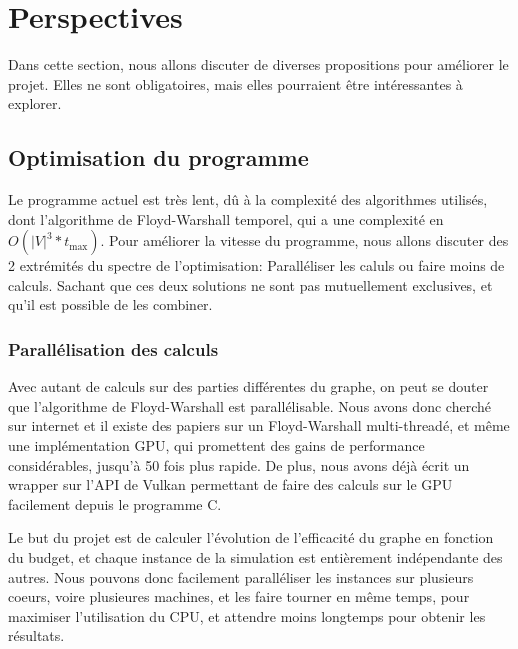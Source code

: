 \section{Perspectives}\label{sec:perspectives}
Dans cette section, nous allons discuter de diverses propositions pour améliorer le projet.
Elles ne sont obligatoires, mais elles pourraient être intéressantes à explorer.

\subsection{Optimisation du programme}\label{subsec:optimisation_du_programme}

Le programme actuel est très lent, dû à la complexité des algorithmes utilisés, dont l'algorithme de Floyd-Warshall temporel, qui a une complexité en $O(|V|^3*t_{\max})$.
Pour améliorer la vitesse du programme, nous allons discuter des 2 extrémités du spectre de l'optimisation: Paralléliser les caluls ou faire moins de calculs.
Sachant que ces deux solutions ne sont pas mutuellement exclusives, et qu'il est possible de les combiner.

\subsubsection{Parallélisation des calculs}\label{subsubsec:parallelisation}

\label{subsubsubsec:parallelisation_algorithme}
Avec autant de calculs sur des parties différentes du graphe, on peut se douter que l'algorithme de Floyd-Warshall est parallélisable.
Nous avons donc cherché sur internet et il existe des papiers sur un Floyd-Warshall multi-threadé\cite{Multithread_FW}\cite{pradhan2013finding}, et même une implémentation GPU\cite{GPU_FW}, qui promettent des gains de performance considérables, jusqu'à 50 fois plus rapide.
De plus, nous avons déjà écrit un wrapper sur l'API de Vulkan permettant de faire des calculs sur le GPU facilement depuis le programme C.

\label{subsubsubsec:parallelisation_simulations} 
Le but du projet est de calculer l'évolution de l'efficacité du graphe en fonction du budget, et chaque instance de la simulation est entièrement indépendante des autres.
Nous pouvons donc facilement paralléliser les instances sur plusieurs coeurs, voire plusieures machines, et les faire tourner en même temps, pour maximiser l'utilisation du CPU, et attendre moins longtemps pour obtenir les résultats.

